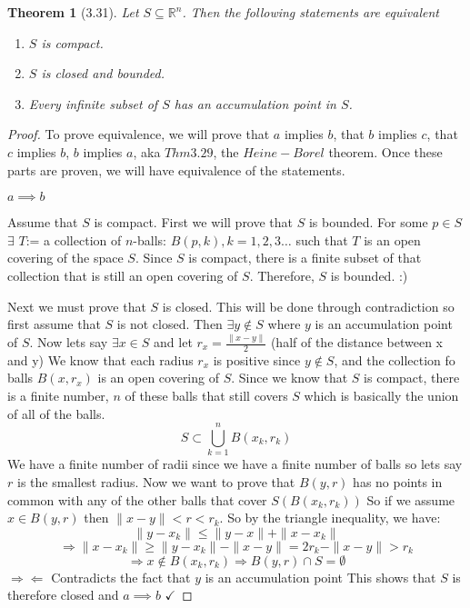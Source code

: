 \documentclass[aps,pra,notitlepage,amsmath,amssymb,letterpaper,12pt]{revtex4-1}
\newtheorem{theorem}{Theorem}
\begin{document}
\begin{theorem}[3.31]
Let $S \subseteq \mathbb{R}^n$. Then the following statements are equivalent
\begin{enumerate}[\upshape a)]
  \item $S$ is compact. %
  \item $S$ is closed and bounded.
  \item Every infinite subset of $S$ has an accumulation point in $S$.
\end{enumerate}
\end{theorem}
\begin{proof}
To prove equivalence, we will prove that \(a\) implies \(b\),
that \(b\) implies \(c\), that \(c\) implies \(b\), \(b\) implies \(a\), aka \(Thm3.29\),
the \(Heine-Borel\) theorem. Once these parts are proven, we will
have equivalence of the statements.

    \(a\implies b\)

    Assume that \(S\) is compact. First we will prove that \(S\) is bounded.
For some \(p\in S\) \(\exists\) \(T\):= a collection of \(n\)-balls:
\(B(p,k), k=1,2,3\ldots\) such that \(T\) is an open covering of the
space \(S\). Since \(S\) is compact, there is a finite subset of that
collection that is still an open covering of \(S\). Therefore, \(S\) is
bounded. :)

    Next we must prove that \(S\) is closed. This will be done through
contradiction so first assume that \(S\) is not closed. Then
\(\exists y \notin S\) where \(y\) is an accumulation point of \(S\).
Now lets say \(\exists x\in S\) and let \(r_x = \frac{\| x-y\|}{2}\)
(half of the distance between x and y) We know that each radius \(r_x\)
is positive since \(y\notin S\), and the collection fo balls
\(B(x,r_x)\) is an open covering of \(S\). Since we know that \(S\) is
compact, there is a finite number, \(n\) of these balls that still
covers \(S\) which is basically the union of all of the balls.
\[S\subset \bigcup\limits_{k=1}^{n} B(x_k,r_k)\] We have a finite number
of radii since we have a finite number of balls so lets say \(r\) is the
smallest radius. Now we want to prove that \(B(y,r)\) has no points in
common with any of the other balls that cover
\(S\left(B\left(x_k,r_k\right)\right)\) So if we assume \(x\in B(y,r)\)
then \(\| x-y\| <r<r_k\). So by the triangle inequality, we have:
\[\| y-x_k\|\leq\| y-x\| +\| x-x_k\| \]
\[\Rightarrow \| x-x_k\|\geq\| y-x_k\| -\| x-y\| = 2r_k-\| x-y\| >r_k\]
\[\Rightarrow x\notin B(x_k,r_k)\Rightarrow B(y,r)\cap S = \emptyset\]
\(\Rightarrow\Leftarrow\) Contradicts the fact that \(y\) is an
accumulation point This shows that \(S\) is therefore closed and
\(a\implies b\) \(\checkmark\)


\end{proof}
\end{document}
